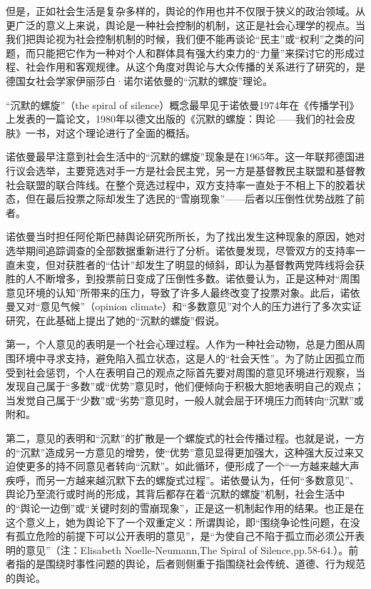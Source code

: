 \documentclass[UTF8,12pt]{ctexart}
\numberwithin{equation}{section} %
\numberwithin{figure}{section}
\numberwithin{table}{section}
\begin{document}
	但是，正如社会生活是复杂多样的，舆论的作用也并不仅限于狭义的政治领域。从更广泛的意义上来说，舆论是一种社会控制的机制，这正是社会心理学的视点。当我们把舆论视为社会控制机制的时候，我们便不能再谈论“民主”或“权利”之类的问题，而只能把它作为一种对个人和群体具有强大约束力的“力量”来探讨它的形成过程、社会作用和客观规律。从这个角度对舆论与大众传播的关系进行了研究的，是德国女社会学家伊丽莎白·诺尔诺依曼的“沉默的螺旋”理论。
	
	“沉默的螺旋”（the spiral of silence）概念最早见于诺依曼1974年在《传播学刊》上发表的一篇论文，1980年以德文出版的《沉默的螺旋：舆论——我们的社会皮肤》一书，对这个理论进行了全面的概括。
	
	诺依曼最早注意到社会生活中的“沉默的螺旋”现象是在1965年。这一年联邦德国进行议会选举，主要竞选对手一方是社会民主党，另一方是基督教民主联盟和基督教社会联盟的联合阵线。在整个竞选过程中，双方支持率一直处于不相上下的胶着状态，但在最后投票之际却发生了选民的“雪崩现象”——后者以压倒性优势战胜了前者。
	
	诺依曼当时担任阿伦斯巴赫舆论研究所所长，为了找出发生这种现象的原因，她对选举期间追踪调查的全部数据重新进行了分析。诺依曼发现，尽管双方的支持率一直未变，但对获胜者的“估计”却发生了明显的倾斜，即认为基督教两党阵线将会获胜的人不断增多，到投票前日变成了压倒性多数。诺依曼认为，正是这种对“周围意见环境的认知”所带来的压力，导致了许多人最终改变了投票对象。此后，诺依曼又对“意见气候”（opinion climate）和“多数意见”对个人的压力进行了多次实证研究，在此基础上提出了她的“沉默的螺旋”假说。
	
	第一，个人意见的表明是一个社会心理过程。人作为一种社会动物，总是力图从周围环境中寻求支持，避免陷入孤立状态，这是人的“社会天性”。为了防止因孤立而受到社会惩罚，个人在表明自己的观点之际首先要对周围的意见环境进行观察，当发现自己属于“多数”或“优势”意见时，他们便倾向于积极大胆地表明自己的观点；当发觉自己属于“少数”或“劣势”意见时，一般人就会屈于环境压力而转向“沉默”或附和。
	
	第二，意见的表明和“沉默”的扩散是一个螺旋式的社会传播过程。也就是说，一方的“沉默”造成另一方意见的增势，使“优势”意见显得更加强大，这种强大反过来又迫使更多的持不同意见者转向“沉默”。如此循环，便形成了一个“一方越来越大声疾呼，而另一方越来越沉默下去的螺旋式过程”。诺依曼认为，任何“多数意见”、舆论乃至流行或时尚的形成，其背后都存在着“沉默的螺旋”机制，社会生活中的“舆论一边倒”或“关键时刻的雪崩现象”，正是这一机制起作用的结果。也正是在这个意义上，她为舆论下了一个双重定义：所谓舆论，即“围绕争论性问题，在没有孤立危险的前提下可以公开表明的意见”，是“为使自己不陷于孤立而必须公开表明的意见”（注：Elisabeth Noelle-Neumann,The Spiral of Silence,pp.58-64.）。前者指的是围绕时事性问题的舆论，后者则侧重于指围绕社会传统、道德、行为规范的舆论。
	
\end{document}
